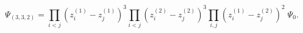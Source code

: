 \begin{equation}
\Psi_{(3,3,2)}=
\prod_{i<j} (z_i^{(1)}-z_j^{(1)})^{3}
\prod_{i<j} (z_i^{(2)}-z_j^{(2)})^{3}
\prod_{i,j} (z_i^{(1)}-z_j^{(2)})^{2}\; \Psi_{0}.
\end{equation}

